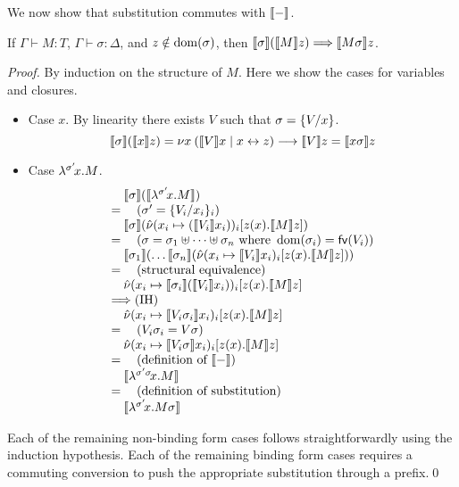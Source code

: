 \documentclass[oribibl,orivec,envcountsame]{llncs}
\begin{document}
We now show that substitution commutes with $\tocp{-}$.
\begin{lemma}
\label{lem:tocp-subst}
If $\Gamma \vdash M : T$, $\Gamma \vdash \sigma : \Delta$, and $z \notin \dom(\sigma)$, then
$\tocp{\sigma}(\tocp{M}z) \bigrto \tocp{M \sigma}z$.
\end{lemma}
\begin{proof}
By induction on the structure of $M$. Here we show the cases for variables and closures.
\begin{itemize}
\item Case $x$. By linearity there exists $V$ such that $\sigma = \{\bind{x}{V}\}$.
\[
\tocp{\sigma}(\tocp{x}z) =
\cut{x}{}{\tocp{V}x}{\link{x}{z}} \rto \tocp{V}z = \tocp{x \sigma}z
\]
\item Case $\clos{\sigma'}{x}{M}$.
\[
\bl
\quad \tocp{\sigma}(\tocp{\clos{\sigma'}{x}{M}}) \\
= \quad (\sigma' = \{\bind{x_i}{V_i}\}_i) \\
\quad \tocp{\sigma}(\hat{\nu} (x_i \mapsto (\tocp{V_i}x_i))_i[z(x).\tocp{M}z]) \\
= \quad (\sigma = \sigma_1 \uplus \dots \uplus \sigma_n \text{ where } \dom(\sigma_i) = \fv(V_i)) \\
\quad \tocp{\sigma_1}(\dots\tocp{\sigma_n} (\hat{\nu} (x_i \mapsto \tocp{V_i}x_i)_i[z(x).\tocp{M}z])) \\
= \quad (\text{structural equivalence}) \\
\quad \hat{\nu} (x_i \mapsto \tocp{\sigma_i}(\tocp{V_i}x_i))_i[z(x).\tocp{M}z] \\
\bigrto (\text{IH}) \\
\quad \hat{\nu} (x_i \mapsto \tocp{V_i \sigma_i}x_i)_i[z(x).\tocp{M}z] \\
= \quad (V_i \sigma_i = V \sigma) \\
\quad \hat{\nu} (x_i \mapsto \tocp{V_i \sigma}x_i)_i[z(x).\tocp{M}z] \\
= \quad (\text{definition of }\tocp{-}) \\
\quad \tocp{\clos{\sigma' \sigma}{x}{M}} \\
= \quad (\text{definition of substitution}) \\
\quad \tocp{\clos{\sigma'}{x}{M} \sigma} \\
\el
\]
\end{itemize}
Each of the remaining non-binding form cases follows straightforwardly using the induction
hypothesis. Each of the remaining binding form cases requires a commuting conversion to push the
appropriate substitution through a prefix.\qed
\end{proof}
\end{document}
